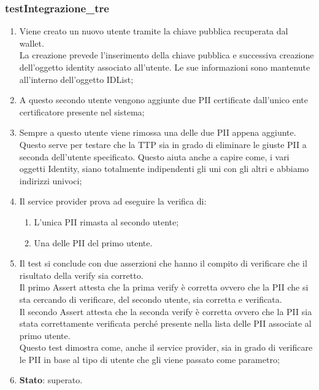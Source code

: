 \subsubsection{testIntegrazione\_tre}
\begin{enumerate}
	\item Viene creato un nuovo utente tramite la chiave pubblica recuperata dal wallet.\\
	La creazione prevede l'inserimento della chiave pubblica e successiva creazione dell'oggetto identity associato all'utente. Le sue informazioni sono mantenute all'interno dell'oggetto IDList;	
	\item A questo secondo utente vengono aggiunte due \gls{PII} certificate dall'unico ente certificatore presente nel sistema;
	\item Sempre a questo utente viene rimossa una delle due \gls{PII} appena aggiunte. Questo serve per testare che la \gls{TTP} sia in grado di eliminare le giuste \gls{PII} a seconda dell'utente specificato. Questo aiuta anche a capire come, i vari oggetti Identity, siano totalmente indipendenti gli uni con gli altri e abbiamo indirizzi univoci; 
	\item Il service provider prova ad eseguire la verifica di:
	\begin{enumerate}
		\item L'unica \gls{PII} rimasta al secondo utente;
		\item Una delle \gls{PII} del primo utente.
	\end{enumerate}
	\item Il test si conclude con due asserzioni che hanno il compito di verificare che il risultato della verify sia corretto.\\
	Il primo Assert attesta che la prima verify è corretta ovvero che la \gls{PII} che si sta cercando di verificare, del secondo utente, sia corretta e verificata.\\
	Il secondo Assert attesta che la seconda verify è corretta ovvero che la \gls{PII} sia stata correttamente verificata perché presente nella lista delle \gls{PII} associate al primo utente.\\
	Questo test dimostra come, anche il service provider, sia in grado di verificare le \gls{PII} in base al tipo di utente che gli viene passato come parametro;
	\item \textbf{Stato}: superato.
\end{enumerate}

